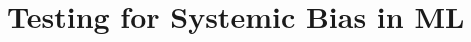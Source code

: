 \documentclass[11pt,aspectratio=169,hyperref={colorlinks}]{beamer}
\begin{document}


							

	\section{Testing for Systemic Bias in ML}
\end{document}
